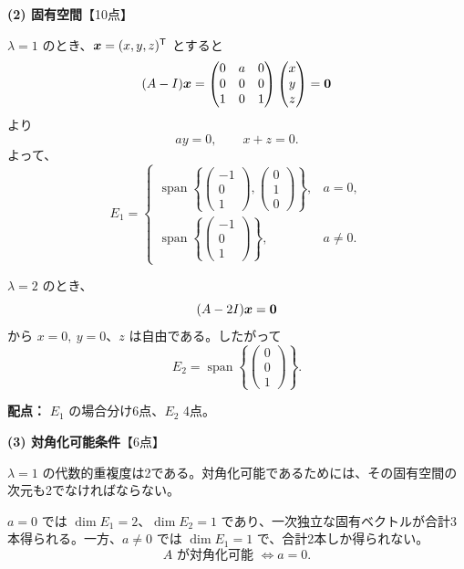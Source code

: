 \begin{solutionbox}
\textbf{(2) 固有空間}\hfill【10点】

$\lambda=1$ のとき、$\bm{x}=(x,y,z)^{\mathsf T}$ とすると
\[
(A-I)\bm{x}=
\begin{pmatrix}
0&a&0\\
0&0&0\\
1&0&1
\end{pmatrix}
\begin{pmatrix}x\\y\\z\end{pmatrix}=\bm{0}
\]
より
\[
ay=0,\qquad x+z=0.
\]
よって、
\[
E_1=\begin{cases}
\operatorname{span}\left\{
\begin{pmatrix}-1\\0\\1\end{pmatrix},
\begin{pmatrix}0\\1\\0\end{pmatrix}
\right\}, & a=0,\\[5mm]
\operatorname{span}\left\{
\begin{pmatrix}-1\\0\\1\end{pmatrix}
\right\}, & a\neq 0.
\end{cases}
\]

$\lambda=2$ のとき、
\[
(A-2I)\bm{x}=\bm{0}
\]
から $x=0,\ y=0$、$z$ は自由である。したがって
\[
\boxed{E_2=\operatorname{span}\left\{\begin{pmatrix}0\\0\\1\end{pmatrix}\right\}}.
\]

\textbf{配点：} $E_1$ の場合分け6点、$E_2$ 4点。
\end{solutionbox}

\newpage
\begin{solutionbox}
\textbf{(3) 対角化可能条件}\hfill【6点】

$\lambda=1$ の代数的重複度は2である。対角化可能であるためには、その固有空間の次元も2でなければならない。

$a=0$ では $\dim E_1=2$、$\dim E_2=1$ であり、一次独立な固有ベクトルが合計3本得られる。一方、$a\neq0$ では $\dim E_1=1$ で、合計2本しか得られない。
\[
\boxed{A\text{ が対角化可能 }\Longleftrightarrow a=0.}
\]
\end{solutionbox}

